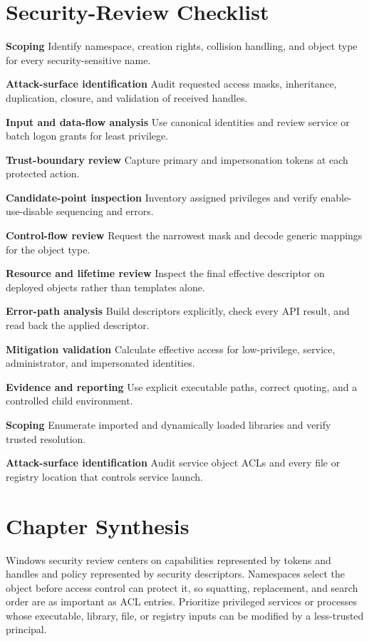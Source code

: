 \documentclass[11pt,letterpaper]{article}
\begin{document}
\section{Security-Review Checklist}
\begin{CornellChecklist}
\item \textbf{Scoping}
Identify namespace, creation rights, collision handling, and object type for every security-sensitive name.
\item \textbf{Attack-surface identification}
Audit requested access masks, inheritance, duplication, closure, and validation of received handles.
\item \textbf{Input and data-flow analysis}
Use canonical identities and review service or batch logon grants for least privilege.
\item \textbf{Trust-boundary review}
Capture primary and impersonation tokens at each protected action.
\item \textbf{Candidate-point inspection}
Inventory assigned privileges and verify enable-use-disable sequencing and errors.
\item \textbf{Control-flow review}
Request the narrowest mask and decode generic mappings for the object type.
\item \textbf{Resource and lifetime review}
Inspect the final effective descriptor on deployed objects rather than templates alone.
\item \textbf{Error-path analysis}
Build descriptors explicitly, check every API result, and read back the applied descriptor.
\item \textbf{Mitigation validation}
Calculate effective access for low-privilege, service, administrator, and impersonated identities.
\item \textbf{Evidence and reporting}
Use explicit executable paths, correct quoting, and a controlled child environment.
\item \textbf{Scoping}
Enumerate imported and dynamically loaded libraries and verify trusted resolution.
\item \textbf{Attack-surface identification}
Audit service object ACLs and every file or registry location that controls service launch.
\end{CornellChecklist}
\section{Chapter Synthesis}
Windows security review centers on capabilities represented by tokens and handles and policy represented by security descriptors. Namespaces select the object before access control can protect it, so squatting, replacement, and search order are as important as ACL entries. Prioritize privileged services or processes whose executable, library, file, or registry inputs can be modified by a less-trusted principal.
\end{document}

